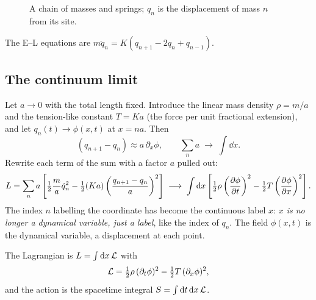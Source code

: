 \documentclass[11pt]{article}
\begin{document}
\begin{figure}[ht]
\centering
{}
\caption{A chain of masses and springs; $q_n$ is the displacement of mass $n$ from its site.}
\end{figure}

The E--L equations are $m\ddot q_n=K(q_{n+1}-2q_n+q_{n-1})$.

\subsection{The continuum limit}

Let $a\to0$ with the total length fixed. Introduce the linear mass density $\rho=m/a$ and the tension-like constant $T=Ka$ (the force per unit fractional extension), and let $q_n(t)\to\phi(x,t)$ at $x=na$. Then
\[
  (q_{n+1}-q_n)\approx a\,\partial_x\phi,\qquad \sum_n a\;\to\;\int\dd x .
\]
Rewrite each term of the sum with a factor $a$ pulled out:
\[
  L=\sum_na\left[\tfrac12\frac ma\dot q_n^2-\tfrac12(Ka)\left(\frac{q_{n+1}-q_n}{a}\right)^2\right]\;\longrightarrow\;\int\mathrm{d} x\left[\tfrac12\rho\left(\frac{\partial \phi}{\partial t}\right)^2-\tfrac12T\left(\frac{\partial \phi}{\partial x}\right)^2\right].
\]
The index $n$ labelling the coordinate has become the continuous label $x$: \emph{$x$ is no longer a dynamical variable, just a label}, like the index of $q_n$. The field $\phi(x,t)$ is the dynamical variable, a displacement at each point.

\begin{keyresult}
The Lagrangian is $L=\int\mathrm{d} x\,\mathcal{L}$ with
\begin{equation}
  \mathcal{L}=\tfrac12\rho\,(\partial_t\phi)^2-\tfrac12T\,(\partial_x\phi)^2 ,
\end{equation}
and the action is the spacetime integral $S=\int\mathrm{d} t\,\mathrm{d} x\,\mathcal{L}$.
\end{keyresult}
\end{document}
